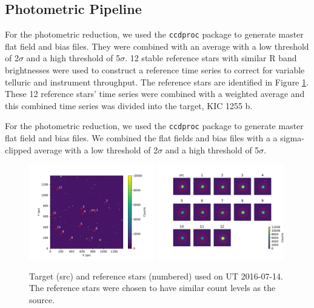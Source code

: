 \documentclass[preprint]{aastex61}
\newcommand{\sha}{KIC 1255 b}
\begin{document}
\subsection{Photometric Pipeline}

For the photometric reduction, we used the \texttt{ccdproc} package to generate master flat field and bias files.
They were combined with an average with a low threshold of 2$\sigma$ and a high threshold of 5$\sigma$.
12 stable reference stars with similar R band brightnesses were used to construct a reference time series to correct for variable telluric and instrument throughput.
The reference stars are identified in Figure \ref{fig:refStars}.
These 12 reference stars' time series were combined with a weighted average and this combined time series was divided into the target, \sha.

For the photometric reduction, we used the \texttt{ccdproc} package to generate master flat field and bias files.
We combined the flat fields and bias files with a a sigma-clipped average with a low threshold of 2$\sigma$ and a high threshold of 5$\sigma$.

\begin{figure}
\begin{centering}
\includegraphics[width=0.49\textwidth]{images/ut2016_07_14_clouds/figure_index_152.pdf}
\includegraphics[width=0.49\textwidth]{images/stamps_kic1255_UT2016_07_14.pdf}
\caption{Target (src) and reference stars (numbered) used on UT 2016-07-14.
The reference stars were chosen to have similar count levels as the source. 
}\label{fig:refStars}
\end{centering}
\end{figure}
\end{document}

